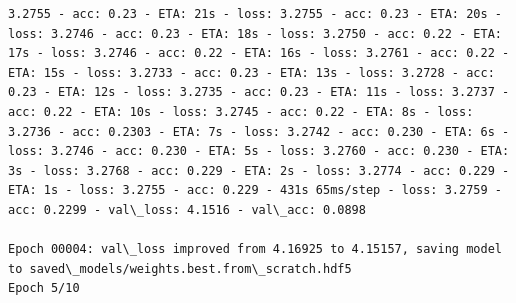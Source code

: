 \documentclass[11pt]{article}
\begin{document}
\begin{Verbatim}[commandchars=\\\{\}]
3.2755 - acc: 0.23 - ETA: 21s - loss: 3.2755 - acc: 0.23 - ETA: 20s - loss: 3.2746 - acc: 0.23 - ETA: 18s - loss: 3.2750 - acc: 0.22 - ETA: 17s - loss: 3.2746 - acc: 0.22 - ETA: 16s - loss: 3.2761 - acc: 0.22 - ETA: 15s - loss: 3.2733 - acc: 0.23 - ETA: 13s - loss: 3.2728 - acc: 0.23 - ETA: 12s - loss: 3.2735 - acc: 0.23 - ETA: 11s - loss: 3.2737 - acc: 0.22 - ETA: 10s - loss: 3.2745 - acc: 0.22 - ETA: 8s - loss: 3.2736 - acc: 0.2303 - ETA: 7s - loss: 3.2742 - acc: 0.230 - ETA: 6s - loss: 3.2746 - acc: 0.230 - ETA: 5s - loss: 3.2760 - acc: 0.230 - ETA: 3s - loss: 3.2768 - acc: 0.229 - ETA: 2s - loss: 3.2774 - acc: 0.229 - ETA: 1s - loss: 3.2755 - acc: 0.229 - 431s 65ms/step - loss: 3.2759 - acc: 0.2299 - val\_loss: 4.1516 - val\_acc: 0.0898

Epoch 00004: val\_loss improved from 4.16925 to 4.15157, saving model to saved\_models/weights.best.from\_scratch.hdf5
Epoch 5/10

\end{Verbatim}
\end{document}
